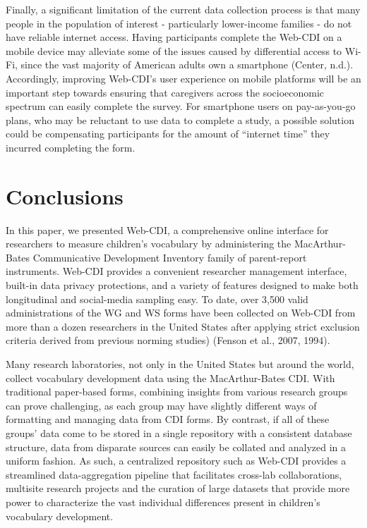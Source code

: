 \documentclass[
  english,
  ,man,floatsintext]{apa6}
\begin{document}
Finally, a significant limitation of the current data collection process is that many people in the population of interest - particularly lower-income families - do not have reliable internet access. Having participants complete the Web-CDI on a mobile device may alleviate some of the issues caused by differential access to Wi-Fi, since the vast majority of American adults own a smartphone (Center, n.d.). Accordingly, improving Web-CDI's user experience on mobile platforms will be an important step towards ensuring that caregivers across the socioeconomic spectrum can easily complete the survey. For smartphone users on pay-as-you-go plans, who may be reluctant to use data to complete a study, a possible solution could be compensating participants for the amount of \enquote{internet time} they incurred completing the form.

\hypertarget{conclusions}{%
\section{Conclusions}\label{conclusions}}

In this paper, we presented Web-CDI, a comprehensive online interface for researchers to measure children's vocabulary by administering the MacArthur-Bates Communicative Development Inventory family of parent-report instruments. Web-CDI provides a convenient researcher management interface, built-in data privacy protections, and a variety of features designed to make both longitudinal and social-media sampling easy. To date, over 3,500 valid administrations of the WG and WS forms have been collected on Web-CDI from more than a dozen researchers in the United States after applying strict exclusion criteria derived from previous norming studies) (Fenson et al., 2007, 1994).

Many research laboratories, not only in the United States but around the world, collect vocabulary development data using the MacArthur-Bates CDI. With traditional paper-based forms, combining insights from various research groups can prove challenging, as each group may have slightly different ways of formatting and managing data from CDI forms. By contrast, if all of these groups' data come to be stored in a single repository with a consistent database structure, data from disparate sources can easily be collated and analyzed in a uniform fashion. As such, a centralized repository such as Web-CDI provides a streamlined data-aggregation pipeline that facilitates cross-lab collaborations, multisite research projects and the curation of large datasets that provide more power to characterize the vast individual differences present in children's vocabulary development.
\end{document}
